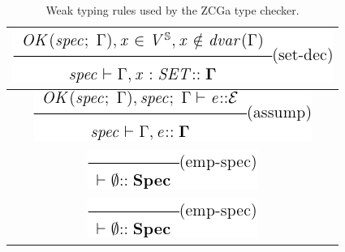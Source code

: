 \begin{table}
\begin{tabular}{|c|}
        \hline
        \includegraphics[scale=0.6]{Figures/zcga/7.png} \\
        \hline
        \includegraphics[scale=0.6]{Figures/zcga/8.png} \\
        \hline
        \includegraphics[scale=0.6]{Figures/zcga/9.png} \\
        \hline
        \includegraphics[scale=0.6]{Figures/zcga/10.png} \\
        \hline
    \end{tabular}
    \caption{Weak typing rules used by the ZCGa type checker. \label{tab:wttrules}}
\end{table}


